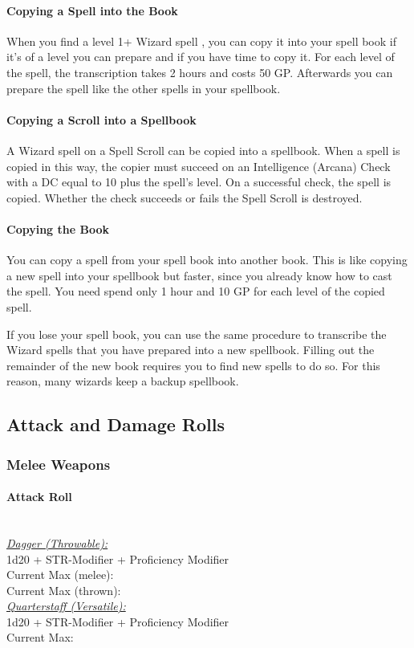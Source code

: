 \documentclass[letterpaper,openany,oneside,twocolumn]{book}
\begin{document}
\paragraph*{Copying a Spell into the Book} When you find a level 1+ Wizard spell , you can copy it into your
spell book if it's of a level you can prepare and if you have time to copy it. For each level of the spell, the transcription takes 2 hours and costs 50 GP. Afterwards you can prepare the spell like the other spells in your spellbook.
\paragraph*{Copying a Scroll into a Spellbook} A Wizard spell on a Spell Scroll can be copied into a spellbook. When a spell is copied in this way, the copier must succeed on an Intelligence (Arcana) Check with a DC equal to 10 plus the spell's level. On a successful check, the spell is copied. Whether the check succeeds or fails the Spell Scroll is destroyed.
\paragraph*{Copying the Book} You can copy a spell from your spell book into another book. This is like copying a new spell into your spellbook but faster, since you already know how to cast the spell. You need spend only 1 hour and 10 GP for each level of the copied spell.

If you lose your spell book, you can use the same procedure to transcribe the Wizard spells that you have prepared into a new spellbook. Filling out the remainder of the new book requires you to find new spells to do so. For this reason, many wizards keep a backup spellbook. 

\vfill\eject

\subsection*{Attack and Damage Rolls}
\subsubsection*{Melee Weapons}
\paragraph*{Attack Roll}\hfill\\
\underline{\textit{Dagger (Throwable):}}\\
1d20 + STR-Modifier + Proficiency Modifier\\
\indent Current Max (melee): \\
\indent Current Max (thrown): 
\\
\underline{\textit{Quarterstaff (Versatile):}}\\
1d20 + STR-Modifier + Proficiency Modifier\\
\indent Current Max: 
\end{document}
